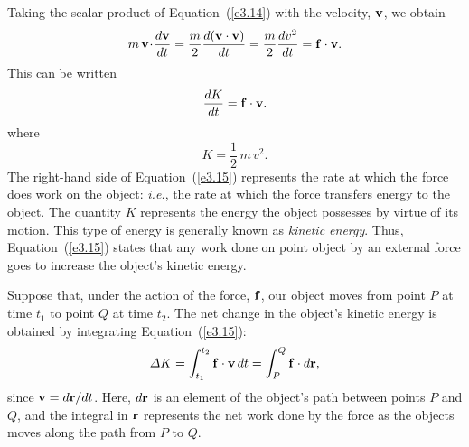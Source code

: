 Taking the scalar product of Equation~(\ref{e3.14}) with the velocity, ${\bf v}$,
we obtain
\begin{equation}
m\,{\bf v}\!\cdot\!\frac{d {\bf v}}{dt} = 
\frac{m}{2}\frac{d({\bf v}\cdot{\bf v})}{dt}=\frac{m}{2}\frac{d v^2}{dt} = 
{\bf f}\cdot{\bf v}.
\end{equation}
This can be written
\begin{equation}\label{e3.15}
\frac{d K}{dt} = {\bf f}\cdot {\bf v}.
\end{equation}
where 
\begin{equation}
K = \frac{1}{2}\,m\,v^2.
\end{equation}
The right-hand side of Equation~(\ref{e3.15}) represents the rate at
which the force does work on the object: {\em i.e.},
the rate at which the force transfers energy to the object. The quantity
$K$ represents the energy the object possesses by virtue of its motion.
This type of energy is generally known as {\em kinetic energy}. Thus, Equation~(\ref{e3.15}) states that any work done on  point object by an external force
goes to increase the object's kinetic energy.

Suppose that, under the action of the force, ${\bf f}$, our object moves
from point $P$ at time $t_1$ to point $Q$ at time $t_2$. The
net change in the object's kinetic energy is obtained by integrating
Equation~(\ref{e3.15}):
\begin{equation}\label{e3.18}
{\mit\Delta}K = \int_{t_1}^{t_2} {\bf f}\cdot{\bf v}\,dt
=\int_P^Q {\bf f}\cdot d{\bf r},
\end{equation}
since ${\bf v} = d{\bf r}/dt$.
Here, $d{\bf r}$ is an element of the object's path between points $P$
and $Q$, and the integral in ${\bf r}$ represents the net work done by the
force as the objects moves along the path from $P$ to $Q$. 

